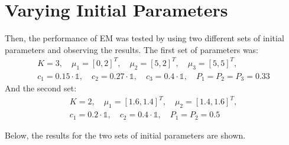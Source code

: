 \documentclass[DIV=12, ngerman, fontsize=12pt, parskip=half]{scrreprt}
\begin{document}
	\section{Varying Initial Parameters}
	Then, the performance of EM was tested by using two different sets of initial parameters and observing the results. The first set of parameters was:
	\begin{align*}
		K = 3, \quad \mu_1 = [0,2]^T, \quad \mu_2 = [5,2]^T, \quad \mu_3 = [5,5]^T, \\ c_1 = 0.15 \cdot \mathbb{1}, \quad c_2 = 0.27 \cdot \mathbb{1}, \quad c_3 = 0.4 \cdot \mathbb{1}, \quad P_1 = P_2 = P_3 = 0.33
	\end{align*}
	And the second set:
	\begin{align*}
	K = 2, \quad \mu_1 = [1.6,1.4]^T, \quad \mu_2 = [1.4,1.6]^T, \\ c_1 = 0.2 \cdot \mathbb{1}, \quad c_2 = 0.4 \cdot \mathbb{1}, \quad P_1 = P_2 = 0.5
	\end{align*}	

	Below, the results for the two sets of initial parameters are shown. 
	
\end{document}
